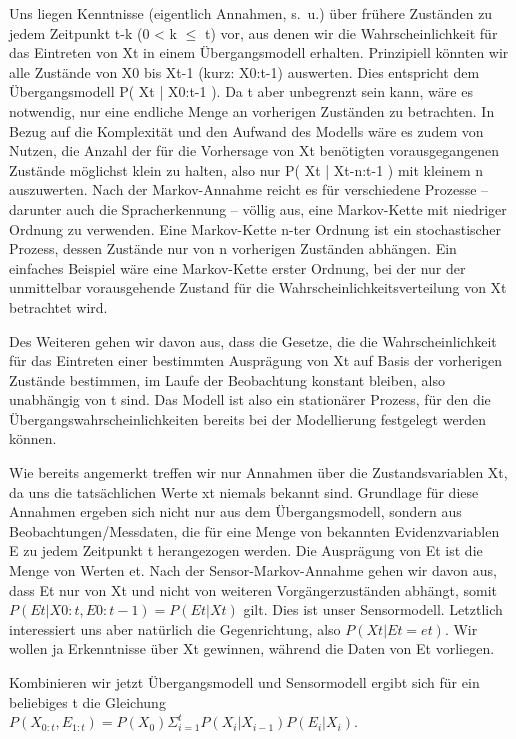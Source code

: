 Uns liegen Kenntnisse (eigentlich Annahmen, s.~u.) über frühere Zuständen zu jedem Zeitpunkt t-k (0 < k $\le$ t) vor, aus denen wir die Wahrscheinlichkeit für das Eintreten von Xt in einem Übergangsmodell erhalten.
Prinzipiell könnten wir alle Zustände von X0 bis Xt-1 (kurz: X0:t-1) auswerten.
Dies entspricht dem Übergangsmodell P( Xt | X0:t-1 ).
Da t aber unbegrenzt sein kann, wäre es notwendig, nur eine endliche Menge an vorherigen Zuständen zu betrachten.
In Bezug auf die Komplexität und den Aufwand des Modells wäre es zudem von Nutzen, die Anzahl der für die Vorhersage von Xt benötigten vorausgegangenen Zustände möglichst klein zu halten, also nur P( Xt | Xt-n:t-1 ) mit kleinem n auszuwerten.
Nach der Markov-Annahme reicht es für verschiedene Prozesse – darunter auch die Spracherkennung – völlig aus, eine Markov-Kette mit niedriger Ordnung zu verwenden.
Eine Markov-Kette n-ter Ordnung ist ein stochastischer Prozess, dessen Zustände nur von n vorherigen Zuständen abhängen.
Ein einfaches Beispiel wäre eine Markov-Kette erster Ordnung, bei der nur der unmittelbar vorausgehende Zustand für die Wahrscheinlichkeitsverteilung von Xt betrachtet wird.


Des Weiteren gehen wir davon aus, dass die Gesetze, die die Wahrscheinlichkeit für das Eintreten einer bestimmten Ausprägung von Xt auf Basis der vorherigen Zustände bestimmen, im Laufe der Beobachtung konstant bleiben, also unabhängig von t sind.
Das Modell ist also ein stationärer Prozess, für den die Übergangswahrscheinlichkeiten bereits bei der Modellierung festgelegt werden können.

Wie bereits angemerkt treffen wir nur Annahmen über die Zustandsvariablen Xt, da uns die tatsächlichen Werte xt niemals bekannt sind.
Grundlage für diese Annahmen ergeben sich nicht nur aus dem Übergangsmodell, sondern aus Beobachtungen/Messdaten, die für eine Menge von bekannten Evidenzvariablen E zu jedem Zeitpunkt t herangezogen werden.
Die Ausprägung von Et ist die Menge von Werten et.
Nach der Sensor-Markov-Annahme gehen wir davon aus, dass Et nur von Xt und nicht von weiteren Vorgängerzuständen abhängt, somit $P( Et | X0:t, E0:t-1 ) = P( Et | Xt )$ gilt.
Dies ist unser Sensormodell.
Letztlich interessiert uns aber natürlich die Gegenrichtung, also $P( Xt | Et = et )$.
Wir wollen ja Erkenntnisse über Xt gewinnen, während die Daten von Et vorliegen.

Kombinieren wir jetzt Übergangsmodell und Sensormodell ergibt sich für ein beliebiges t die Gleichung $P(X_{0:t},E_{1:t}) = P(X_0) \Sigma_{i=1}^t P(X_i | X_{i-1}) P(E_i | X_i)$.

